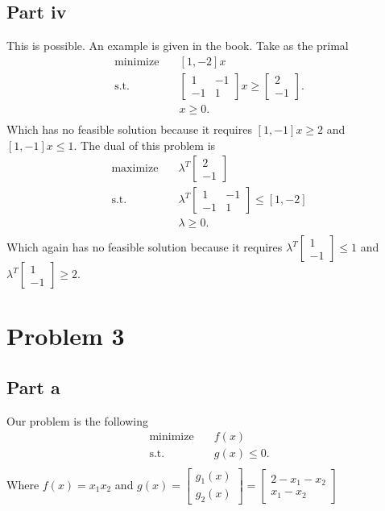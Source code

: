 \documentclass{article}
\begin{document}
\subsection*{Part iv}
This is possible. An example is given in the book. Take as the primal
\[
\begin{aligned}
	\text{minimize}\quad & [1,-2]x\\
\textrm{s.t.} \quad &\begin{bmatrix}
	1 & -1\\
	-1 & 1
\end{bmatrix}x\geq \begin{bmatrix}
2\\	
-1
\end{bmatrix}.\\
	      \quad &x\geq 0.\\
\end{aligned}
\]
Which has no feasible solution because it requires $[1,-1]x\geq 2$ and
$[1,-1]x\leq 1$. The dual of this problem is
\[
\begin{aligned}
	\text{maximize}\quad & \lambda^T\begin{bmatrix}
	2\\	
	-1
	\end{bmatrix}\\
\textrm{s.t.} \quad &\lambda^T\begin{bmatrix}
	1 & -1\\
	-1 & 1
	\end{bmatrix}\leq [1,-2]\\
	      \quad &\lambda\geq 0.\\
\end{aligned}
\]
Which again has no feasible solution because it requires $\lambda^T\begin{bmatrix}
1\\
-1
\end{bmatrix}\leq 1$ and $\lambda^T\begin{bmatrix}
1\\
-1
\end{bmatrix}\geq 2$.
\section*{Problem 3}
\subsection*{Part a}
Our problem is the following
\[
\begin{aligned}
\text{minimize}\quad & f(x)\\
\textrm{s.t.} \quad &g(x)\leq 0.\\
\end{aligned}
\]
Where $f(x)=x_1x_2$ and $g(x)=\begin{bmatrix}
g_1(x)\\
g_2(x)
\end{bmatrix}=\begin{bmatrix}
2-x_1-x_2\\
x_1-x_2
\end{bmatrix}$
\end{document}
